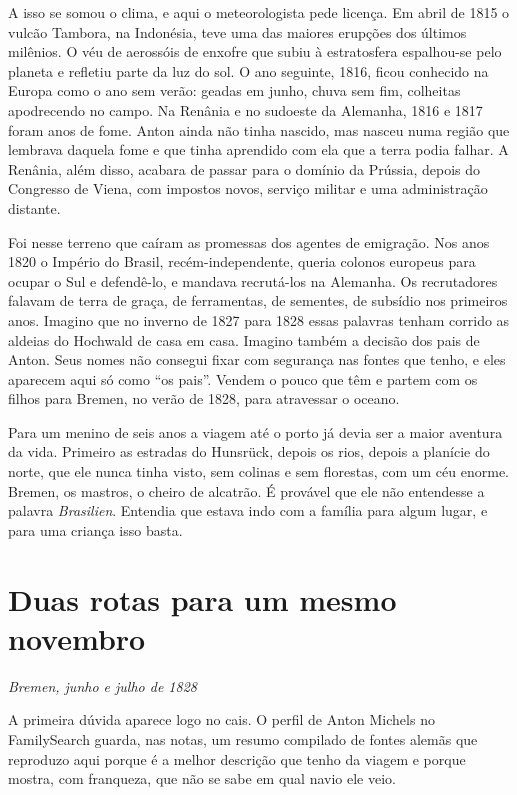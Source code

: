 \documentclass[
  brazilian,
  11pt,
  openany]{book}
\begin{document}
A isso se somou o clima, e aqui o meteorologista pede licença. Em abril
de 1815 o vulcão Tambora, na Indonésia, teve uma das maiores erupções
dos últimos milênios. O véu de aerossóis de enxofre que subiu à
estratosfera espalhou-se pelo planeta e refletiu parte da luz do sol. O
ano seguinte, 1816, ficou conhecido na Europa como o ano sem verão:
geadas em junho, chuva sem fim, colheitas apodrecendo no campo. Na
Renânia e no sudoeste da Alemanha, 1816 e 1817 foram anos de fome. Anton
ainda não tinha nascido, mas nasceu numa região que lembrava daquela
fome e que tinha aprendido com ela que a terra podia falhar. A Renânia,
além disso, acabara de passar para o domínio da Prússia, depois do
Congresso de Viena, com impostos novos, serviço militar e uma
administração distante.

Foi nesse terreno que caíram as promessas dos agentes de emigração. Nos
anos 1820 o Império do Brasil, recém-independente, queria colonos
europeus para ocupar o Sul e defendê-lo, e mandava recrutá-los na
Alemanha. Os recrutadores falavam de terra de graça, de ferramentas, de
sementes, de subsídio nos primeiros anos. Imagino que no inverno de 1827
para 1828 essas palavras tenham corrido as aldeias do Hochwald de casa
em casa. Imagino também a decisão dos pais de Anton. Seus nomes não
consegui fixar com segurança nas fontes que tenho, e eles aparecem aqui
só como ``os pais''. Vendem o pouco que têm e partem com os filhos para
Bremen, no verão de 1828, para atravessar o oceano.

Para um menino de seis anos a viagem até o porto já devia ser a maior
aventura da vida. Primeiro as estradas do Hunsrück, depois os rios,
depois a planície do norte, que ele nunca tinha visto, sem colinas e sem
florestas, com um céu enorme. Bremen, os mastros, o cheiro de alcatrão.
É provável que ele não entendesse a palavra \emph{Brasilien}. Entendia
que estava indo com a família para algum lugar, e para uma criança isso
basta.

\section{Duas rotas para um mesmo
novembro}\label{duas-rotas-para-um-mesmo-novembro}

\emph{Bremen, junho e julho de 1828}

A primeira dúvida aparece logo no cais. O perfil de Anton Michels no
FamilySearch guarda, nas notas, um resumo compilado de fontes alemãs que
reproduzo aqui porque é a melhor descrição que tenho da viagem e porque
mostra, com franqueza, que não se sabe em qual navio ele veio.
\end{document}
